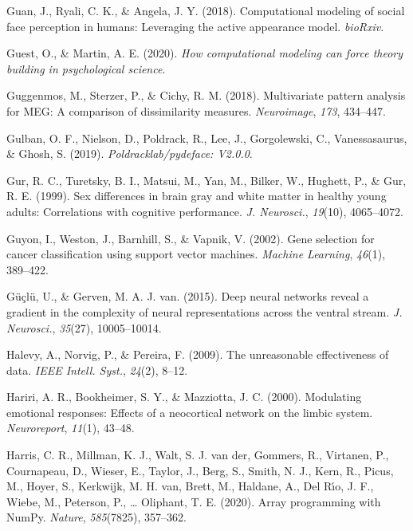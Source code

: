 \documentclass[11pt,american,a4paper,oneside,]{memoir} %
\begin{document}
\leavevmode\hypertarget{ref-Guan2018-hq}{}%
Guan, J., Ryali, C. K., \& Angela, J. Y. (2018). Computational modeling of social face perception in humans: Leveraging the active appearance model. \emph{bioRxiv}.

\leavevmode\hypertarget{ref-Guest2020-ef}{}%
Guest, O., \& Martin, A. E. (2020). \emph{How computational modeling can force theory building in psychological science}.

\leavevmode\hypertarget{ref-Guggenmos2018-rr}{}%
Guggenmos, M., Sterzer, P., \& Cichy, R. M. (2018). Multivariate pattern analysis for MEG: A comparison of dissimilarity measures. \emph{Neuroimage}, \emph{173}, 434--447.

\leavevmode\hypertarget{ref-Gulban2019-sv}{}%
Gulban, O. F., Nielson, D., Poldrack, R., Lee, J., Gorgolewski, C., Vanessasaurus, \& Ghosh, S. (2019). \emph{Poldracklab/pydeface: V2.0.0}.

\leavevmode\hypertarget{ref-Gur1999-qj}{}%
Gur, R. C., Turetsky, B. I., Matsui, M., Yan, M., Bilker, W., Hughett, P., \& Gur, R. E. (1999). Sex differences in brain gray and white matter in healthy young adults: Correlations with cognitive performance. \emph{J. Neurosci.}, \emph{19}(10), 4065--4072.

\leavevmode\hypertarget{ref-guyon2002gene}{}%
Guyon, I., Weston, J., Barnhill, S., \& Vapnik, V. (2002). Gene selection for cancer classification using support vector machines. \emph{Machine Learning}, \emph{46}(1), 389--422.

\leavevmode\hypertarget{ref-Guclu2015-qj}{}%
Güçlü, U., \& Gerven, M. A. J. van. (2015). Deep neural networks reveal a gradient in the complexity of neural representations across the ventral stream. \emph{J. Neurosci.}, \emph{35}(27), 10005--10014.

\leavevmode\hypertarget{ref-Halevy2009-cv}{}%
Halevy, A., Norvig, P., \& Pereira, F. (2009). The unreasonable effectiveness of data. \emph{IEEE Intell. Syst.}, \emph{24}(2), 8--12.

\leavevmode\hypertarget{ref-Hariri2000-sc}{}%
Hariri, A. R., Bookheimer, S. Y., \& Mazziotta, J. C. (2000). Modulating emotional responses: Effects of a neocortical network on the limbic system. \emph{Neuroreport}, \emph{11}(1), 43--48.

\leavevmode\hypertarget{ref-Harris2020-en}{}%
Harris, C. R., Millman, K. J., Walt, S. J. van der, Gommers, R., Virtanen, P., Cournapeau, D., Wieser, E., Taylor, J., Berg, S., Smith, N. J., Kern, R., Picus, M., Hoyer, S., Kerkwijk, M. H. van, Brett, M., Haldane, A., Del Rı́o, J. F., Wiebe, M., Peterson, P., \ldots{} Oliphant, T. E. (2020). Array programming with NumPy. \emph{Nature}, \emph{585}(7825), 357--362.
\end{document}
